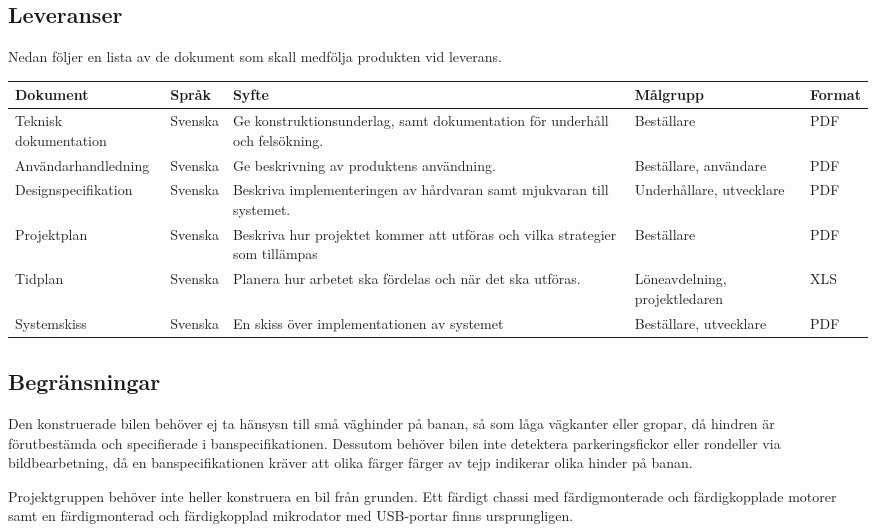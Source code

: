 \documentclass[projektplan/plan.tex]{subfiles}
\begin{document}
\begin{minipage}{\textwidth}
\subsection{Leveranser}
\label{sec:doc}
Nedan följer en lista av de dokument som skall medfölja produkten vid leverans.
{\renewcommand{\arraystretch}{1.6}
\begin{longtable}{p{4.5cm}p{1.5cm}p{5cm}p{2.2cm}p{1.2cm}}
    \bfseries Dokument &
    \bfseries Språk &
    \bfseries Syfte &
    \bfseries Målgrupp &
    \bfseries Format \\\hline
    Teknisk dokumentation &
    Svenska &
    Ge konstruktionsunderlag, samt dokumentation för underhåll och
    felsökning. &
    Beställare &
    PDF
    \\
    Användarhandledning &
    Svenska &
    Ge beskrivning av produktens användning. &
    Beställare, användare &
    PDF
    \\
    Designspecifikation &
    Svenska &
    Beskriva implementeringen av hårdvaran samt mjukvaran till systemet. &
    Underhållare, utvecklare &
    PDF
    \\
    Projektplan &
    Svenska &
    Beskriva hur projektet kommer att utföras och vilka strategier som
    tillämpas &
    Beställare &
    PDF
    \\
    Tidplan &
    Svenska &
    Planera hur arbetet ska fördelas och när det ska utföras. &
    Löne\-avdelning, projekt\-ledaren &
    XLS
    \\
    Systemskiss &
    Svenska &
    En skiss över implementationen av systemet &
    Beställare, utvecklare &
    PDF
    \\
    
    \endhead
\end{longtable}}
\end{minipage}

\subsection{Begränsningar}
Den konstruerade bilen behöver ej ta hänsysn till små väghinder på banan, så
som låga vägkanter eller gropar, då hindren är förutbestämda och specifierade
i banspecifikationen. Dessutom behöver bilen inte detektera parkeringsfickor
eller rondeller via bildbearbetning, då en banspecifikationen kräver att olika
färger färger av tejp indikerar olika hinder på banan.

Projektgruppen behöver inte heller konstruera en bil från grunden. Ett färdigt
chassi med färdigmonterade och färdigkopplade motorer samt en färdigmonterad
och färdigkopplad mikrodator med USB-portar finns ursprungligen.
\end{document}
